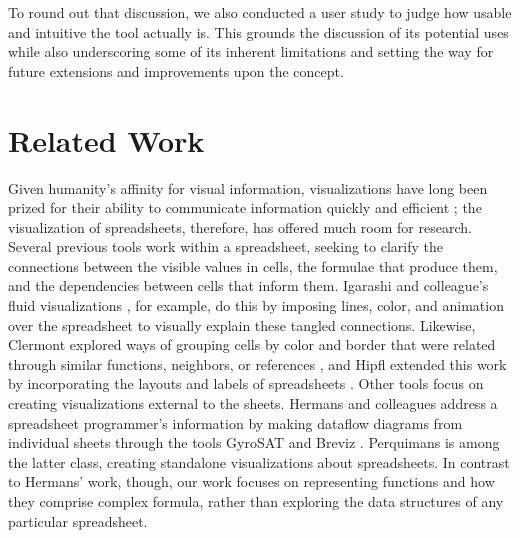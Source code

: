 \documentclass[conference]{IEEEtran}
\newcommand{\toolname}{Perquimans }
\begin{document}
	To round out that discussion, we also conducted a user study to judge how
	usable and intuitive the tool actually is. This grounds the discussion of its
	potential uses while also underscoring some of its inherent limitations and
	setting the way for future extensions and improvements upon the concept.
	
	\section{Related Work} \label{related-work} Given humanity's affinity for
	visual information, visualizations have long been prized for their ability to
	communicate information quickly and efficient \cite{baeza1999modern}; the
	visualization of spreadsheets, therefore, has offered much room for research.
	Several previous tools work within a spreadsheet, seeking to clarify the
	connections between the visible values in cells, the formulae that produce
	them, and the dependencies between cells that inform them. Igarashi and
	colleague's fluid visualizations \cite{igarashi1998fluid}, for example, do this
	by imposing lines, color, and animation over the spreadsheet to visually
	explain these tangled connections. Likewise, Clermont explored ways of grouping
	cells by color and border that were related through similar functions,
	neighbors, or references \cite{clermont2003scalable}, and Hipfl extended this
	work by incorporating the layouts and labels of spreadsheets
	\cite{hipfl2008using}. Other tools focus on creating visualizations external to
	the sheets. Hermans and colleagues address a spreadsheet programmer's
	information by making dataflow diagrams from individual sheets through the
	tools GyroSAT \cite{hermans2011supporting} and Breviz \cite{hermans2011breviz}.
	\toolname is among the latter class, creating standalone visualizations about
	spreadsheets. In contrast to Hermans' work, though, our work focuses on
	representing functions and how they comprise complex formula, rather than
	exploring the data structures of any particular spreadsheet.  \par
	
\end{document}
